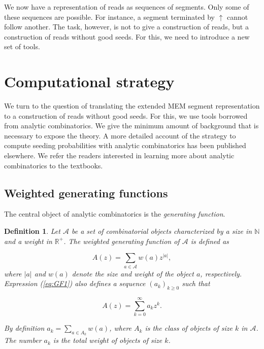 \documentclass{article}
\newtheorem{definition}{Definition}
\begin{document}
We now have a representation of reads as sequences of segments. Only some
of these sequences are possible. For instance, a segment terminated by
$\uparrow$ cannot follow another. The task, however, is not to give a
construction of reads, but a construction of reads without good seeds. For
this, we need to introduce a new set of tools.


\section{Computational strategy}
\label{sec:symbolic}

We turn to the question of translating the extended MEM segment
representation to a construction of reads without good seeds. For this, we
use tools borrowed from analytic combinatorics. We give the minimum amount
of background that is necessary to expose the theory. A more detailed
account of the strategy to compute seeding probabilities with analytic
combinatorics has been published
elsewhere\cite{filion2017analytic,filion2018analytic}. We refer the
readers interested in learning more about analytic combinatorics to the
textbooks\cite{flajolet2009analytic,sedgewick2013introduction}.


\subsection{Weighted generating functions}

The central object of analytic combinatorics is the \emph{generating
function}.

\begin{definition}
\label{def:GF}
Let $\mathcal{A}$ be a set of combinatorial objects characterized by a
size in $\mathbb{N}$ and a weight in $\mathbb{R}^+$. The weighted
generating function of $\mathcal{A}$ is defined as

\begin{equation}
\label{eq:GF1}
A(z) = \sum_{a \in \mathcal{A}} w(a) z^{|a|},
\end{equation}
where $|a|$ and $w(a)$ denote the size and weight of the object $a$,
respectively. Expression (\ref{eq:GF1}) also defines a sequence $(a_k)_{k
\geq 0}$ such that 

\begin{equation*}
A(z) = \sum_{k=0}^\infty a_k z^k.
\end{equation*}

By definition $a_k = \sum_{a \in A_k}w(a)$, where $A_k$ is the class of
objects of size $k$ in $\mathcal{A}$. The number $a_k$ is the
total weight of objects of size $k$.
\end{definition}
\end{document}
